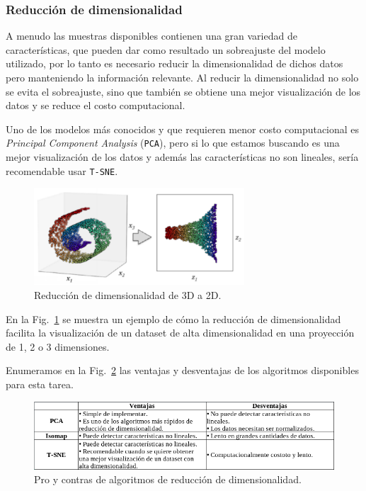 \documentclass[a4paper,12pt]{article}
\begin{document}
\subsubsection{Reducción de dimensionalidad }

A menudo las muestras disponibles contienen una gran variedad de características, que pueden dar como resultado un sobreajuste del modelo utilizado, por lo tanto es necesario reducir la dimensionalidad de dichos datos pero manteniendo la información relevante. Al reducir la dimensionalidad no solo se evita el sobreajuste, sino que también se obtiene una mejor visualización de los datos y se reduce el costo computacional. 

\clearpage

Uno de los modelos más conocidos y que requieren menor costo computacional es \textit{Principal Component Analysis} (\texttt{PCA}), pero si lo que estamos buscando es una mejor visualización de los datos y además las características no son lineales, sería recomendable usar \texttt{T-SNE}. 

\begin{figure}[H]
	\begin{center}				
	\includegraphics[width=0.7\textwidth]{tesis_12.png}
  	\caption{Reducción de dimensionalidad de 3D a 2D.}
  	\label{fig:reduxdimension.}
  	\end{center}
\end{figure}

En la Fig.~\ref{fig:reduxdimension.} \cite{trejoml} se muestra un ejemplo de cómo la reducción de dimensionalidad facilita la visualización de un dataset de alta dimensionalidad en una proyección de 1, 2 o 3 dimensiones.

Enumeramos en la Fig.~\ref{fig:proconsreduxdim.} las ventajas y desventajas de los algoritmos disponibles para esta tarea.

\begin{figure}[H]
	\begin{center}				
	\includegraphics[width=1\textwidth]{tesis_15.png}
  	\caption{Pro y contras de algoritmos de reducción de dimensionalidad.}
  	\label{fig:proconsreduxdim.}
  	\end{center}
\end{figure}
\end{document}
